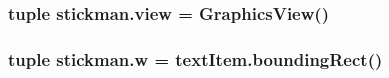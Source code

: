 \subsubsection[{view}]{\setlength{\rightskip}{0pt plus 5cm}tuple stickman.\+view = {\bf Graphics\+View}()}\label{namespacestickman_a9b7b294b6b24ca2dca6ecceee16e3d9b}
\hypertarget{namespacestickman_a1061806814c37e16835abeaab049a871}{}
\subsubsection[{w}]{\setlength{\rightskip}{0pt plus 5cm}tuple stickman.\+w = text\+Item.\+bounding\+Rect()}\label{namespacestickman_a1061806814c37e16835abeaab049a871}
